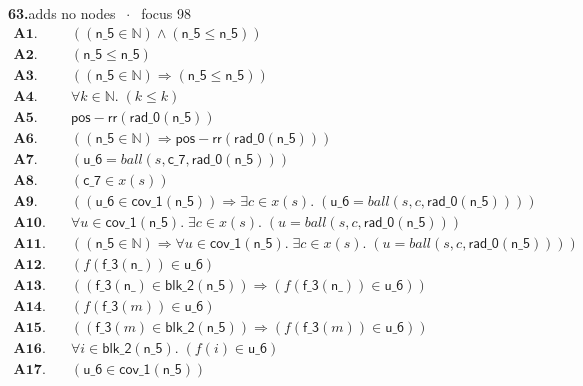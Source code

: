 \documentclass[11pt]{article}
\newcommand{\fit}[1]{\resizebox{\ifdim\width>\linewidth\linewidth\else\width\fi}{!}{#1}}
\begin{document}
\medskip\noindent\textbf{63.}\quad \fit{\texttt{(ass)}}\hfill{\small adds no nodes $\;\cdot\;$ focus 98}\\[2pt]
\begin{align*}
  \mathbf{A1.}\quad & ((\mathsf{n\_5} \in \mathbb{N}) \wedge (\mathsf{n\_5} \leq \mathsf{n\_5})) \\
  \mathbf{A2.}\quad & (\mathsf{n\_5} \leq \mathsf{n\_5}) \\
  \mathbf{A3.}\quad & ((\mathsf{n\_5} \in \mathbb{N}) \Rightarrow (\mathsf{n\_5} \leq \mathsf{n\_5})) \\
  \mathbf{A4.}\quad & \forall k \in \mathbb{N}.\; (k \leq k) \\
  \mathbf{A5.}\quad & \mathsf{pos{-}rr}(\mathsf{rad\_0}(\mathsf{n\_5})) \\
  \mathbf{A6.}\quad & ((\mathsf{n\_5} \in \mathbb{N}) \Rightarrow \mathsf{pos{-}rr}(\mathsf{rad\_0}(\mathsf{n\_5}))) \\
  \mathbf{A7.}\quad & (\mathsf{u\_6} = \mathit{ball}(s, \mathsf{c\_7}, \mathsf{rad\_0}(\mathsf{n\_5}))) \\
  \mathbf{A8.}\quad & (\mathsf{c\_7} \in x(s)) \\
  \mathbf{A9.}\quad & ((\mathsf{u\_6} \in \mathsf{cov\_1}(\mathsf{n\_5})) \Rightarrow \exists c \in x(s).\; (\mathsf{u\_6} = \mathit{ball}(s, c, \mathsf{rad\_0}(\mathsf{n\_5})))) \\
  \mathbf{A10.}\quad & \forall u \in \mathsf{cov\_1}(\mathsf{n\_5}).\; \exists c \in x(s).\; (u = \mathit{ball}(s, c, \mathsf{rad\_0}(\mathsf{n\_5}))) \\
  \mathbf{A11.}\quad & ((\mathsf{n\_5} \in \mathbb{N}) \Rightarrow \forall u \in \mathsf{cov\_1}(\mathsf{n\_5}).\; \exists c \in x(s).\; (u = \mathit{ball}(s, c, \mathsf{rad\_0}(\mathsf{n\_5})))) \\
  \mathbf{A12.}\quad & (f(\mathsf{f\_3}(\mathsf{n\_})) \in \mathsf{u\_6}) \\
  \mathbf{A13.}\quad & ((\mathsf{f\_3}(\mathsf{n\_}) \in \mathsf{blk\_2}(\mathsf{n\_5})) \Rightarrow (f(\mathsf{f\_3}(\mathsf{n\_})) \in \mathsf{u\_6})) \\
  \mathbf{A14.}\quad & (f(\mathsf{f\_3}(m)) \in \mathsf{u\_6}) \\
  \mathbf{A15.}\quad & ((\mathsf{f\_3}(m) \in \mathsf{blk\_2}(\mathsf{n\_5})) \Rightarrow (f(\mathsf{f\_3}(m)) \in \mathsf{u\_6})) \\
  \mathbf{A16.}\quad & \forall i \in \mathsf{blk\_2}(\mathsf{n\_5}).\; (f(i) \in \mathsf{u\_6}) \\
  \mathbf{A17.}\quad & (\mathsf{u\_6} \in \mathsf{cov\_1}(\mathsf{n\_5})) \\

\end{align*}
\end{document}

